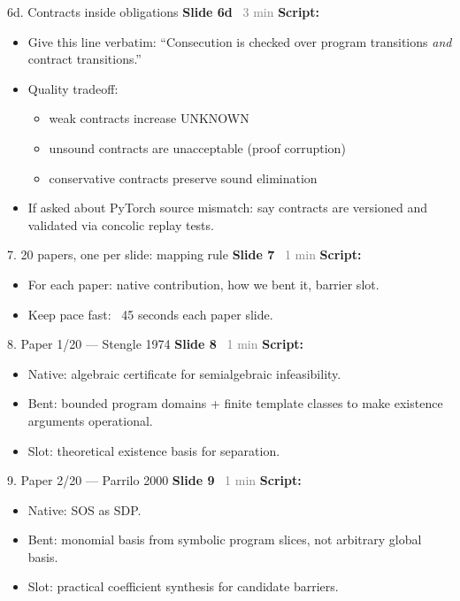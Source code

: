 \documentclass[aspectratio=169]{beamer}
\newcommand{\syncline}[2]{\textbf{#1} \hfill \textcolor{gray}{#2}}
\begin{document}
\begin{frame}{6d. Contracts inside obligations}
\syncline{Slide 6d}{~3 min}
\textbf{Script:}
\begin{itemize}
  \item Give this line verbatim: ``Consecution is checked over program transitions \emph{and} contract transitions.''
  \item Quality tradeoff:
  \begin{itemize}
    \item weak contracts increase UNKNOWN
    \item unsound contracts are unacceptable (proof corruption)
    \item conservative contracts preserve sound elimination
  \end{itemize}
  \item If asked about PyTorch source mismatch: say contracts are versioned and validated via concolic replay tests.
\end{itemize}
\end{frame}

\begin{frame}{7. 20 papers, one per slide: mapping rule}
\syncline{Slide 7}{~1 min}
\textbf{Script:}
\begin{itemize}
  \item For each paper: native contribution, how we bent it, barrier slot.
  \item Keep pace fast: ~45 seconds each paper slide.
\end{itemize}
\end{frame}

\begin{frame}[shrink=18]{8. Paper 1/20 — Stengle 1974}
\syncline{Slide 8}{~1 min}
\textbf{Script:}
\begin{itemize}
  \item Native: algebraic certificate for semialgebraic infeasibility.
  \item Bent: bounded program domains + finite template classes to make existence arguments operational.
  \item Slot: theoretical existence basis for separation.
\end{itemize}
\end{frame}

\begin{frame}[shrink=18]{9. Paper 2/20 — Parrilo 2000}
\syncline{Slide 9}{~1 min}
\textbf{Script:}
\begin{itemize}
  \item Native: SOS as SDP.
  \item Bent: monomial basis from symbolic program slices, not arbitrary global basis.
  \item Slot: practical coefficient synthesis for candidate barriers.
\end{itemize}
\end{frame}
\end{document}
